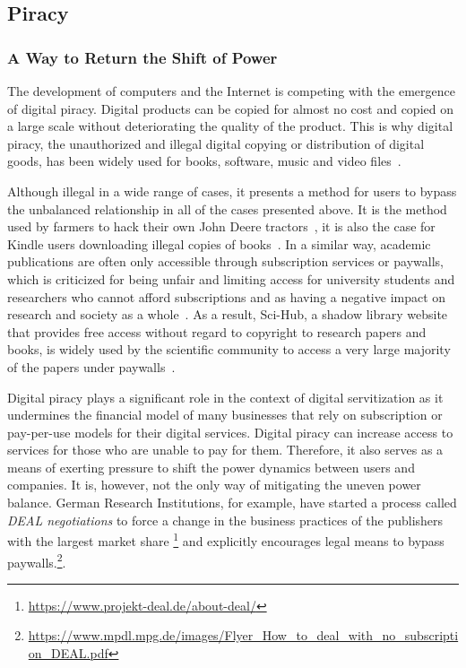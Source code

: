 \documentclass[sigplan,screen,nonacm]{acmart}
\begin{document}
\subsection{Piracy}
\subsubsection{A Way to Return the Shift of Power}
The development of computers and the Internet is competing with the emergence of digital piracy. Digital products can be copied for almost no cost and copied on a large scale without deteriorating the quality of the product. This is why digital piracy, the unauthorized and illegal digital copying or distribution of digital goods, has been widely used for books, software, music and video files~\cite{peitz2006piracy}. 

Although illegal in a wide range of cases, it presents a method for users to bypass the unbalanced relationship in all of the cases presented above. It is the method used by farmers to hack their own John Deere tractors~\cite{koebler2017american}, it is also the case for Kindle users downloading illegal copies of books~\cite{camarero2014technological}. In a similar way, academic publications are often only accessible through subscription services or paywalls, which is criticized for being unfair and limiting access for university students and researchers who cannot afford subscriptions and as having a negative impact on research and society as a whole~\cite{van2013true}. As a result, Sci-Hub, a shadow library website that provides free access without regard to copyright to research papers and books, is widely used by the scientific community to access a very large majority of the papers under paywalls~\cite{himmelstein2018sci}.

Digital piracy plays a significant role in the context of digital servitization as it undermines the financial model of many businesses that rely on subscription or pay-per-use models for their digital services. Digital piracy can increase access to services for those who are unable to pay for them. Therefore, it also serves as a means of exerting pressure to shift the power dynamics between users and companies. It is, however, not the only way of mitigating the uneven power balance. German Research Institutions, for example, have started a process called \textit{DEAL negotiations} to force a change in the business practices of the publishers with the largest market share \footnote{\url{https://www.projekt-deal.de/about-deal/}} and explicitly encourages legal means to bypass paywalls.\footnote{\url{https://www.mpdl.mpg.de/images/Flyer_How_to_deal_with_no_subscription_DEAL.pdf}}.
\end{document}
